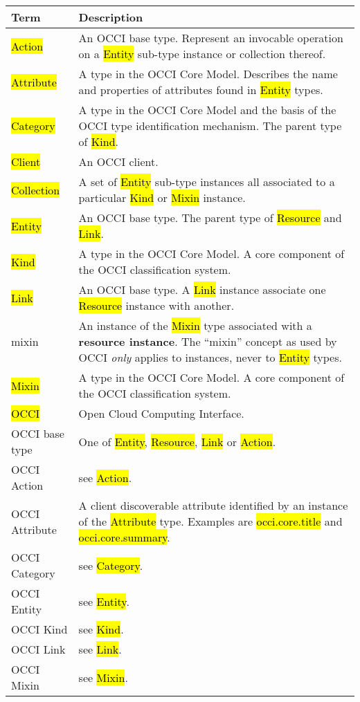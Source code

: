 \begin{tabular}{l|p{12cm}}
Term & Description \\
\hline
\hl{Action} & An OCCI base type. Represent an invocable operation on a \hl{Entity} sub-type instance or collection thereof. \\

\hl{Attribute} & A type in the OCCI Core Model. Describes the name and properties of attributes found in \hl{Entity} types. \\

\hl{Category} & A type in the OCCI Core Model and the basis of the OCCI type identification mechanism. The parent type of \hl{Kind}. \\

\hl{Client} & An OCCI client.\\

\hl{Collection} & A set of \hl{Entity} sub-type instances all associated to a particular \hl{Kind} or \hl{Mixin} instance. \\

\hl{Entity} & An OCCI base type. The parent type of \hl{Resource} and \hl{Link}. \\

\hl{Kind} & A type in the OCCI Core Model. A core component of the OCCI classification system. \\

\hl{Link} & An OCCI base type. A \hl{Link} instance associate one \hl{Resource} instance with another. \\

mixin & An instance of the \hl{Mixin} type associated with a {\bf resource
 instance}. The ``mixin'' concept as used by OCCI {\em only} applies to
 instances, never to \hl{Entity} types. \\

\hl{Mixin} & A type in the OCCI Core Model. A core component of the OCCI classification system. \\

\hl{OCCI} & Open Cloud Computing Interface. \\

OCCI base type & One of \hl{Entity}, \hl{Resource}, \hl{Link} or \hl{Action}. \\

OCCI Action & see \hl{Action}. \\
OCCI Attribute & A client discoverable attribute identified by an instance of the \hl{Attribute} type. Examples are \hl{occi.core.title} and \hl{occi.core.summary}. \\
OCCI Category & see \hl{Category}. \\
OCCI Entity & see \hl{Entity}. \\
OCCI Kind & see \hl{Kind}. \\
OCCI Link & see \hl{Link}. \\
OCCI Mixin & see \hl{Mixin}. \\


\end{tabular}
